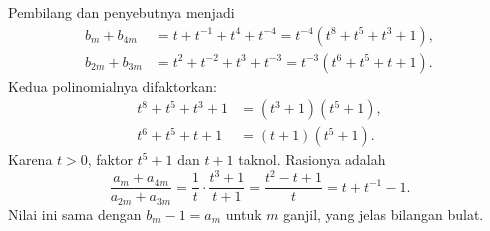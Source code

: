 \documentclass[12pt]{scrartcl}
\begin{document}
\begin{enumerate}[resume]
\begin{enumerate}[(a)]
		Pembilang dan penyebutnya menjadi
		\begin{align*}
		b_m + b_{4m} &= t + t^{-1} + t^4 + t^{-4}
		= t^{-4}(t^8 + t^5 + t^3 + 1), \\
		b_{2m} + b_{3m} &= t^2 + t^{-2} + t^3 + t^{-3}
		= t^{-3}(t^6 + t^5 + t + 1).
		\end{align*}
		Kedua polinomialnya difaktorkan:
		\begin{align*}
		t^8 + t^5 + t^3 + 1 &= (t^3 + 1)(t^5 + 1), \\
		t^6 + t^5 + t + 1 &= (t + 1)(t^5 + 1).
		\end{align*}
		Karena $t > 0$, faktor $t^5 + 1$ dan $t + 1$ taknol.
		Rasionya adalah
		\[ \frac{a_m + a_{4m}}{a_{2m} + a_{3m}}
		= \frac{1}{t} \cdot \frac{t^3 + 1}{t + 1}
		= \frac{t^2 - t + 1}{t}
		= t + t^{-1} - 1. \]
		Nilai ini sama dengan $b_m - 1 = a_m$ untuk $m$ ganjil,
		yang jelas bilangan bulat.
	\end{enumerate}

\end{enumerate}
\end{document}
